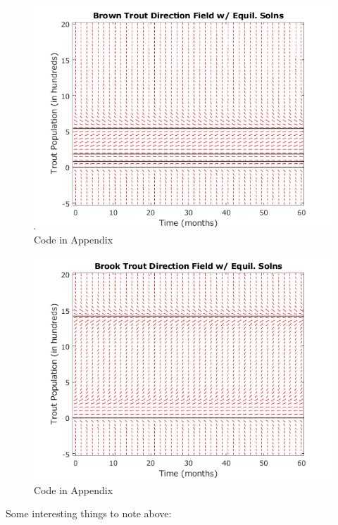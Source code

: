 \documentclass[letterpaper,12pt]{article}
\begin{document}
\begin{figure}[H]
    \centering
    \includegraphics{./figures/fig.3.4.2.png}
    \caption{Code in Appendix}
    \label{fig:5}
\end{figure}
\begin{figure}[H]
    \centering
    \includegraphics{./figures/fig.3.4.3.png}
    \caption{Code in Appendix}
    \label{fig:6}
\end{figure}
Some interesting things to note above:
\end{document}

